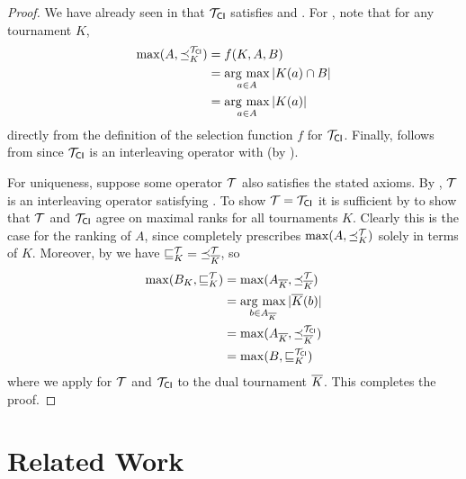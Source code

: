 \begin{proof}
    We have already seen in  that
    ${\mathcal{T}_{\mathsf{CI}}}$ satisfies \dualaxiom{} and \chaindef{}. For
    \argmaxaxiom{}, note that for any tournament $K$,
    \begin{align*}
        \max(A, {\preceq_K^{{\mathcal{T}_{\mathsf{CI}}}}})
        &= f(K, A, B) \\
        &= \operatorname*{arg\ max}_{a \in A}{|K(a) \cap B|} \\
        &= \operatorname*{arg\ max}_{a \in A}{|K(a)|}
    \end{align*}
    directly from the definition of the selection function $f$ for
    ${\mathcal{T}_{\mathsf{CI}}}$. Finally, \rankremoval{} follows from
     since ${\mathcal{T}_{\mathsf{CI}}}$ is an interleaving
    operator with \smi{} (by ).

    For uniqueness, suppose some operator $\mathcal{T}$ also satisfies the stated
    axioms. By , $\mathcal{T}$ is an interleaving
    operator satisfying \smi{}. To show $\mathcal{T} = {\mathcal{T}_{\mathsf{CI}}}$ it is
    sufficient by  to show that
    $\mathcal{T}$ and ${\mathcal{T}_{\mathsf{CI}}}$ agree on maximal ranks for all tournaments $K$.
    Clearly this is the case for the ranking of $A$, since \argmaxaxiom{}
    completely prescribes $\max(A, {\preceq_K^{\mathcal{T}}})$ solely in terms of $K$.
    Moreover, by \dualaxiom{} we have ${\sqsubseteq_K^{\mathcal{T}}} =
    {\preceq_{{\overline{K}}}^{\mathcal{T}}}$, so
    \begin{align*}
        \max(B_K, {\sqsubseteq_K^{\mathcal{T}}})
        &= \max(A_{{\overline{K}}}, {\preceq_{{\overline{K}}}^{\mathcal{T}}}) \\
        &= \operatorname*{arg\ max}_{b \in A_{{\overline{K}}}}|{\overline{K}}(b)| \\
        &= \max(A_{{\overline{K}}}, {\preceq_{{\overline{K}}}^{{\mathcal{T}_{\mathsf{CI}}}}}) \\
        &= \max(B, {\sqsubseteq_K^{{\mathcal{T}_{\mathsf{CI}}}}})
    \end{align*}
    where we apply \argmaxaxiom{} for $\mathcal{T}$ and ${\mathcal{T}_{\mathsf{CI}}}$ to the dual
    tournament ${\overline{K}}$. This completes the proof.
\end{proof}

\section{Related Work}
\label{tourn_sec_related_work}

